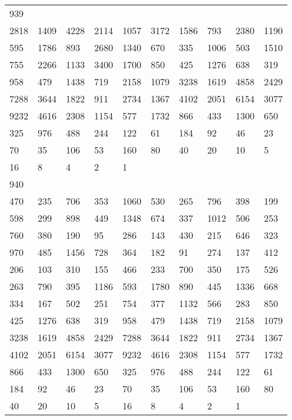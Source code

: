 \begin{longtable}{*{10}{l}}
939&&&&&&&&&\\
2818& 1409& 4228& 2114& 1057& 3172& 1586& 793& 2380& 1190\\
595& 1786& 893& 2680& 1340& 670& 335& 1006& 503& 1510\\
755& 2266& 1133& 3400& 1700& 850& 425& 1276& 638& 319\\
958& 479& 1438& 719& 2158& 1079& 3238& 1619& 4858& 2429\\
7288& 3644& 1822& 911& 2734& 1367& 4102& 2051& 6154& 3077\\
9232& 4616& 2308& 1154& 577& 1732& 866& 433& 1300& 650\\
325& 976& 488& 244& 122& 61& 184& 92& 46& 23\\
70& 35& 106& 53& 160& 80& 40& 20& 10& 5\\
16& 8& 4& 2& 1& \\

940&&&&&&&&&\\
470& 235& 706& 353& 1060& 530& 265& 796& 398& 199\\
598& 299& 898& 449& 1348& 674& 337& 1012& 506& 253\\
760& 380& 190& 95& 286& 143& 430& 215& 646& 323\\
970& 485& 1456& 728& 364& 182& 91& 274& 137& 412\\
206& 103& 310& 155& 466& 233& 700& 350& 175& 526\\
263& 790& 395& 1186& 593& 1780& 890& 445& 1336& 668\\
334& 167& 502& 251& 754& 377& 1132& 566& 283& 850\\
425& 1276& 638& 319& 958& 479& 1438& 719& 2158& 1079\\
3238& 1619& 4858& 2429& 7288& 3644& 1822& 911& 2734& 1367\\
4102& 2051& 6154& 3077& 9232& 4616& 2308& 1154& 577& 1732\\
866& 433& 1300& 650& 325& 976& 488& 244& 122& 61\\
184& 92& 46& 23& 70& 35& 106& 53& 160& 80\\
40& 20& 10& 5& 16& 8& 4& 2& 1& \\


\end{longtable}

